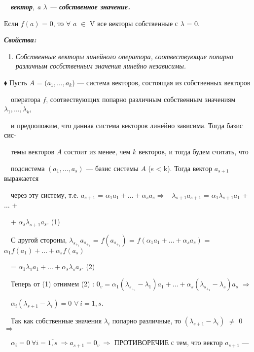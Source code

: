 \documentclass[a4paper, 12pt]{report}
\begin{document}
	\ \ \textit{\textbf{вектор}, a $\lambda$ --- \textbf{собственное значение.}}
	\par\bigskip
	Если $f(a)$ = 0, то $\forall$ $a$ $\in$ V все векторы собственные с $\lambda$ = 0.
	
	\par\bigskip
	\textit{ \textbf{Свойства:}}
	\begin{enumerate}
		\item \textit{Собственные векторы линейного оператора, соотвествующие попарно различным сосбственным значения линейно независимы.}
	\end{enumerate}  
	
	$\blacklozenge$ Пусть $A$ = ($a_1, \dots, a_k$) --- система векторов, состоящая из собственных векторов
	
	$\quad$оператора $f$, соотвествующих попарно различным собственным значениям $\lambda_1, \dots, \lambda_k$,
	
	$\quad$и предположим, что данная система векторов линейно зависима. Тогда базис сис-
	
	$\quad$темы векторов $A$ состоит из менее, чем $k$ векторов, и тогда будем считать, что 
	
	$\quad$подсистема $(a_1, \dots, a_s)$ --- базис системы $A$ (s < k). Тогда вектор $a_{s+1}$ выражается
	
	$\quad$через эту систему, т.е. $a_{s+1}$ = $\alpha_1a_1 + \ldots + \alpha_sa_s \Rightarrow$ \ $\lambda_{s+1}a_{s+1}$ =  $\alpha_1 \lambda_{s+1} a_1$ + $\dots$ + 
	
	$\quad$+ $\alpha_s \lambda_{s+1}a_s$. (1)
	
	$\quad$С другой стороны, $\lambda_s_+_1a_s_+_1$ = $f(a_s_+_1)$ = $f(\alpha_1a_1 + \ldots + \alpha_sa_s)$ = \ $\alpha_1 f(a_1) + \ldots + \alpha_sf(a_s)$
	
	$\quad$= $\alpha_1\lambda_1a_1 + \ldots + \alpha_s\lambda_sa_s$. (2)
	
	$\quad$Теперь от (1) отнимем (2) : $0_v = \alpha_1(\lambda_s_+_1  - \lambda_1)a_1 + \dots + \alpha_s(\lambda_s_+_1 - \lambda_s)a_s$ $\Rightarrow$
	
	$\quad \alpha_i(\lambda_{s+1}  - \lambda_i) = 0$ $\forall\ i = \overline{1, s}$.
	
	$\quad$Так как собственные значения $\lambda_i$ попарно различные, то $(\lambda_{s+1} - \lambda_i)$ $\not=$ 0 $\Rightarrow$ 
	
	$\quad \alpha_i = 0\ \forall i = \overline{1, s}  \ \Rightarrow a_{s+1} = 0_v \ \Rightarrow$ ПРОТИВОРЕЧИЕ с тем, что вектор $a_{s+1}$ --- 
	
\end{document}
